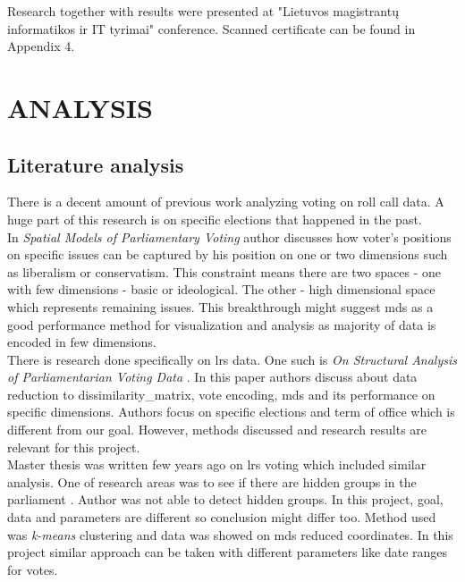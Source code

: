 \documentclass[a4paper,12pt]{article}
\begin{document}
	Research together with results were presented at "Lietuvos magistrantų informatikos ir IT tyrimai" conference. Scanned certificate can be found in Appendix 4.
	
	\clearpage
	
	\section{ANALYSIS}
	
	\subsection{Literature analysis}
	
	There is a decent amount of previous work analyzing voting on roll call data. A huge part of this research is on specific elections that happened in the past.\\	
	
	In \textit{Spatial Models of Parliamentary Voting} \cite{poole_2005} author discusses how voter's positions on specific issues can be captured by his position on one or two dimensions such as liberalism or conservatism. This constraint means there are two spaces - one with few dimensions - basic  or ideological. The other - high dimensional space which represents remaining issues. This breakthrough might suggest \acrlong{mds} as a good performance method for visualization and analysis as majority of data is encoded in few dimensions.\\
	
	
	There is research done specifically on \gls{lrs} data. One such is \textit{On Structural Analysis of Parliamentarian Voting Data} \cite{DBLP:journals/informaticaLT/KrilaviciusZ08}. In this paper authors discuss about data reduction to \gls{dissimilarity_matrix}, vote encoding, \gls{mds} and its performance on specific dimensions. Authors focus on specific elections and term of office which is different from our goal. However, methods discussed and research results are relevant for this project.\\
	
	Master thesis was written few years ago on \gls{lrs} voting which included similar analysis. One of research areas was to see if there are hidden groups in the parliament \cite{vytautas_mick_magistrinis}. Author was not able to detect hidden groups. In this project, goal, data and parameters are different so conclusion might differ too. Method used was \textit{k-means} clustering and data was showed on \gls{mds} reduced coordinates. In this project similar approach can be taken with different parameters like date ranges for votes.  \\
	
\end{document}
